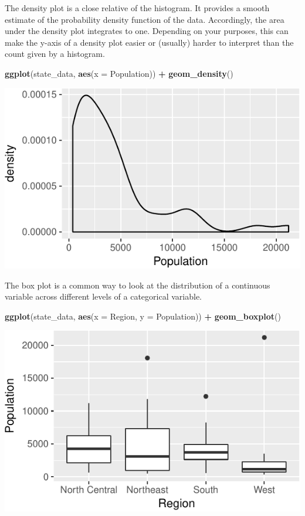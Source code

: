 \documentclass[12pt,oneside,openany]{book}
\newenvironment{Shaded}{\begin{snugshade}}{\end{snugshade}}
\newcommand{\KeywordTok}[1]{\textcolor[rgb]{0.13,0.29,0.53}{\textbf{#1}}}
\newcommand{\DataTypeTok}[1]{\textcolor[rgb]{0.13,0.29,0.53}{#1}}
\newcommand{\StringTok}[1]{\textcolor[rgb]{0.31,0.60,0.02}{#1}}
\newcommand{\OperatorTok}[1]{\textcolor[rgb]{0.81,0.36,0.00}{\textbf{#1}}}
\newcommand{\NormalTok}[1]{#1}
\begin{document}
The density plot is a close relative of the histogram. It provides a
smooth estimate of the probability density function of the data.
Accordingly, the area under the density plot integrates to one.
Depending on your purposes, this can make the y-axis of a density plot
easier or (usually) harder to interpret than the count given by a
histogram.

\begin{Shaded}
\begin{Highlighting}[]
\KeywordTok{ggplot}\NormalTok{(state_data, }\KeywordTok{aes}\NormalTok{(}\DataTypeTok{x =}\NormalTok{ Population)) }\OperatorTok{+}
\StringTok{  }\KeywordTok{geom_density}\NormalTok{()}
\end{Highlighting}
\end{Shaded}

\includegraphics{pdaps_files/figure-latex/density-1.pdf}

The box plot is a common way to look at the distribution of a continuous
variable across different levels of a categorical variable.

\begin{Shaded}
\begin{Highlighting}[]
\KeywordTok{ggplot}\NormalTok{(state_data, }\KeywordTok{aes}\NormalTok{(}\DataTypeTok{x =}\NormalTok{ Region, }\DataTypeTok{y =}\NormalTok{ Population)) }\OperatorTok{+}
\StringTok{  }\KeywordTok{geom_boxplot}\NormalTok{()}
\end{Highlighting}
\end{Shaded}

\includegraphics{pdaps_files/figure-latex/boxplot-1.pdf}
\end{document}

